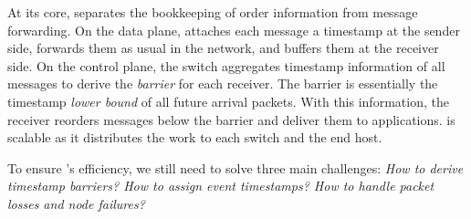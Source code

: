 


At its core, \sys separates the bookkeeping of order information from message forwarding. On the data plane, \sys attaches each message a timestamp at the sender side, forwards them as usual in the network, and buffers them at the receiver side. On the control plane, the switch aggregates timestamp information of all messages to derive the \textit{barrier} for each receiver. The barrier is essentially the timestamp \textit{lower bound} of all future arrival packets. With this information, the receiver reorders messages below the barrier and deliver them to applications. \sys is scalable as it distributes the work to each switch and the end host.

To ensure \sys's efficiency, we still need to solve three main challenges: \textit{How to derive timestamp barriers? How to assign event timestamps? How to handle packet losses and node failures?} 

